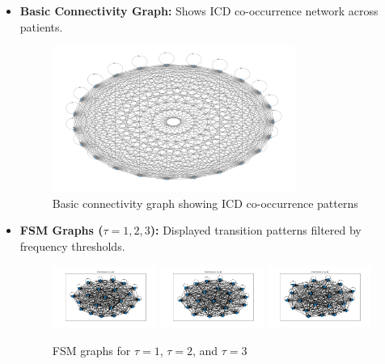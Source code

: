 \documentclass[11pt]{article}
\begin{document}
\begin{itemize}[noitemsep]
    \item \textbf{Basic Connectivity Graph:} Shows ICD co-occurrence network across patients.
    \begin{figure}[H]
        \centering
        \includegraphics[width=0.75\textwidth]{basic_connectivity.png}
        \caption{Basic connectivity graph showing ICD co-occurrence patterns}
    \end{figure}

    \item \textbf{FSM Graphs (\(\tau = 1,2,3\)):} Displayed transition patterns filtered by frequency thresholds.
    \begin{figure}[H]
        \centering
        \includegraphics[width=0.32\textwidth]{fsm_tau_1.png}
        \includegraphics[width=0.32\textwidth]{fsm_tau_2.png}
        \includegraphics[width=0.32\textwidth]{fsm_tau_3.png}
        \caption{FSM graphs for $\tau=1$, $\tau=2$, and $\tau=3$}
    \end{figure}



\end{itemize}
\end{document}

